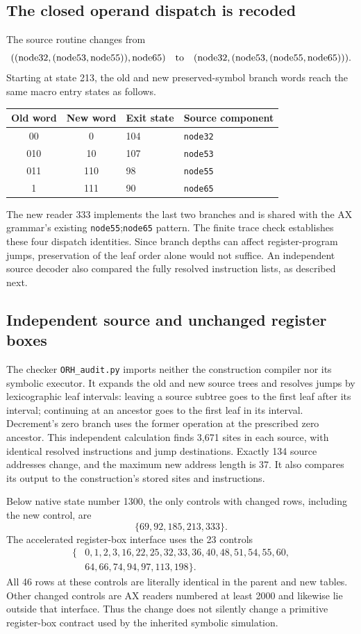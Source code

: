 \subsection{The closed operand dispatch is recoded}
The source routine changes from
\[
 ((\mathrm{node32},(\mathrm{node53},\mathrm{node55})),
   \mathrm{node65})
 \quad\hbox{to}\quad
 (\mathrm{node32},(\mathrm{node53},
   (\mathrm{node55},\mathrm{node65}))).
\]
Starting at state 213, the old and new preserved-symbol branch words
reach the same macro entry states as follows.
\begin{center}
\begin{tabular}{ccll}
Old word & New word & Exit state & Source component\\\hline
00 & 0 & 104 & \texttt{node32}\\
010 & 10 & 107 & \texttt{node53}\\
011 & 110 & 98 & \texttt{node55}\\
1 & 111 & 90 & \texttt{node65}
\end{tabular}
\end{center}
The new reader 333 implements the last two branches and is shared with
the AX grammar's existing \texttt{node55};\texttt{node65} pattern.
The finite trace check establishes these four dispatch identities.
Since branch depths can affect register-program jumps, preservation of
the leaf order alone would not suffice. An independent source decoder
also compared the fully resolved instruction lists, as described next.

\subsection{Independent source and unchanged register boxes}
The checker \texttt{ORH\_audit.py} imports neither the construction
compiler nor its symbolic executor. It expands the old and new source
trees and resolves jumps by lexicographic leaf intervals: leaving a
source subtree goes to the first leaf after its interval; continuing
at an ancestor goes to the first leaf in its interval. Decrement's zero
branch uses the former operation at the prescribed zero ancestor.
This independent calculation finds 3,671 sites in each source, with
identical resolved instructions and jump destinations. Exactly 134
source addresses change, and the maximum new address length is 37.
It also compares its output to the construction's stored sites and
instructions.

Below native state number 1300, the only controls with changed rows,
including the new control, are
\[
 \{69,92,185,213,333\}.
\]
The accelerated register-box interface uses the 23 controls
\[
\begin{split}
\{&0,1,2,3,16,22,25,32,33,36,40,48,51,54,55,60,\\
  &64,66,74,94,97,113,198\}.
\end{split}
\]
All 46 rows at these controls are literally identical in the parent and
new tables. Other changed controls are AX readers numbered at least
2000 and likewise lie outside that interface. Thus the change does not
silently change a primitive register-box contract used by the inherited
symbolic simulation.

